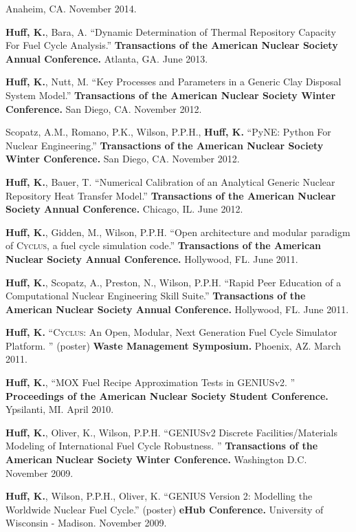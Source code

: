 \documentclass[margin,line]{resume}
\newcommand{\Cyclus}{\textsc{Cyclus}\xspace}%
\begin{document}
\begin{resume}
\begin{bibenum}
         Anaheim, CA. November 2014.
      \item \textbf{Huff, K.}, Bara, A. ``Dynamic Determination of Thermal Repository Capacity For Fuel Cycle Analysis.''
         \textbf{Transactions of the American Nuclear Society Annual Conference.}
         Atlanta, GA. June 2013.
      \item \textbf{Huff, K.}, Nutt, M. ``Key Processes and Parameters in a Generic Clay Disposal System Model.''
         \textbf{Transactions of the American Nuclear Society Winter Conference.}
        San Diego, CA. November 2012.
      \item Scopatz, A.M., Romano, P.K., Wilson, P.P.H., \textbf{Huff, K.} ``PyNE: Python For Nuclear Engineering.''
         \textbf{Transactions of the American Nuclear Society Winter Conference.}
        San Diego, CA. November 2012.
      \item \textbf{Huff, K.}, Bauer, T. ``Numerical Calibration of an Analytical Generic Nuclear Repository Heat Transfer Model.''
         \textbf{Transactions of the American Nuclear Society Annual Conference.}
        Chicago, IL. June 2012.
      \item \textbf{Huff, K.}, Gidden, M., Wilson, P.P.H. ``Open architecture and modular paradigm of \Cyclus, a fuel cycle simulation code.''
         \textbf{Transactions of the American Nuclear Society Annual Conference.}
        Hollywood, FL. June 2011.
      \item \textbf{Huff, K.}, Scopatz, A., Preston, N., Wilson, P.P.H. ``Rapid Peer Education of a Computational Nuclear Engineering Skill Suite.''
         \textbf{Transactions of the American Nuclear Society Annual Conference.}
        Hollywood, FL. June 2011.
      \item \textbf{Huff, K.} ``\Cyclus: An Open, Modular, Next Generation Fuel Cycle Simulator Platform. ''
        (poster)  \textbf{Waste Management Symposium.} Phoenix, AZ. March
        2011.
      \item \textbf{Huff, K.}, ``MOX Fuel Recipe Approximation Tests in GENIUSv2. ''
         \textbf{Proceedings of the American Nuclear Society Student Conference.}
        Ypsilanti, MI. April 2010.
      \item \textbf{Huff, K.}, Oliver, K., Wilson, P.P.H. ``GENIUSv2 Discrete Facilities/Materials Modeling of International
        Fuel Cycle Robustness. ''
         \textbf{Transactions of the American Nuclear Society Winter Conference.}
        Washington D.C. November 2009.
      \item \textbf{Huff, K.}, Wilson, P.P.H., Oliver, K. ``GENIUS Version 2: Modelling the Worldwide Nuclear Fuel Cycle.''
        (poster)  \textbf{eHub Conference.} University of Wisconsin -
        Madison. November 2009.
    \end{bibenum}


\end{resume}
\end{document}
